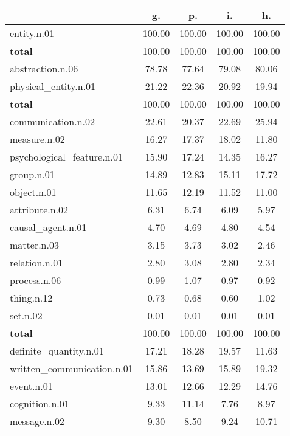 \begin{table}[h!]
\begin{center}
\begin{tabular}{| l || c | c | c | c |}\hline
 & {\bf g.} & {\bf p.} & {\bf i.} & {\bf h.} \\\hline\hline
entity.n.01 & 100.00  & 100.00  & 100.00  & 100.00 \\\hline\hline
{{\bf total}} & 100.00  & 100.00  & 100.00  & 100.00 \\\hline\hline\hline
abstraction.n.06 & 78.78  & 77.64  & 79.08  & 80.06 \\\hline
physical\_entity.n.01 & 21.22  & 22.36  & 20.92  & 19.94 \\\hline\hline
{{\bf total}} & 100.00  & 100.00  & 100.00  & 100.00 \\\hline\hline\hline
communication.n.02 & 22.61  & 20.37  & 22.69  & 25.94 \\\hline
measure.n.02 & 16.27  & 17.37  & 18.02  & 11.80 \\\hline
psychological\_feature.n.01 & 15.90  & 17.24  & 14.35  & 16.27 \\\hline
group.n.01 & 14.89  & 12.83  & 15.11  & 17.72 \\\hline
object.n.01 & 11.65  & 12.19  & 11.52  & 11.00 \\\hline
attribute.n.02 & 6.31  & 6.74  & 6.09  & 5.97 \\\hline
causal\_agent.n.01 & 4.70  & 4.69  & 4.80  & 4.54 \\\hline
matter.n.03 & 3.15  & 3.73  & 3.02  & 2.46 \\\hline
relation.n.01 & 2.80  & 3.08  & 2.80  & 2.34 \\\hline
process.n.06 & 0.99  & 1.07  & 0.97  & 0.92 \\\hline
thing.n.12 & 0.73  & 0.68  & 0.60  & 1.02 \\\hline
set.n.02 & 0.01  & 0.01  & 0.01  & 0.01 \\\hline\hline
{{\bf total}} & 100.00  & 100.00  & 100.00  & 100.00 \\\hline\hline\hline
definite\_quantity.n.01 & 17.21  & 18.28  & 19.57  & 11.63 \\\hline
written\_communication.n.01 & 15.86  & 13.69  & 15.89  & 19.32 \\\hline
event.n.01 & 13.01  & 12.66  & 12.29  & 14.76 \\\hline
cognition.n.01 & 9.33  & 11.14  & 7.76  & 8.97 \\\hline
message.n.02 & 9.30  & 8.50  & 9.24  & 10.71 \\\hline

\end{tabular}
\end{center}
\end{table}
